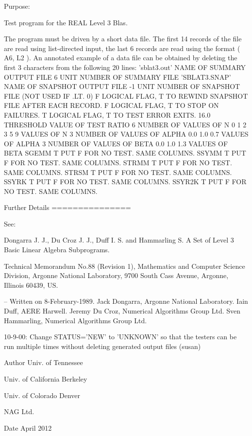 \begin{DoxyParagraph}{Purpose\+: }
\begin{DoxyVerb} Test program for the REAL             Level 3 Blas.

 The program must be driven by a short data file. The first 14 records
 of the file are read using list-directed input, the last 6 records
 are read using the format ( A6, L2 ). An annotated example of a data
 file can be obtained by deleting the first 3 characters from the
 following 20 lines:
 'sblat3.out'      NAME OF SUMMARY OUTPUT FILE
 6                 UNIT NUMBER OF SUMMARY FILE
 'SBLAT3.SNAP'     NAME OF SNAPSHOT OUTPUT FILE
 -1                UNIT NUMBER OF SNAPSHOT FILE (NOT USED IF .LT. 0)
 F        LOGICAL FLAG, T TO REWIND SNAPSHOT FILE AFTER EACH RECORD.
 F        LOGICAL FLAG, T TO STOP ON FAILURES.
 T        LOGICAL FLAG, T TO TEST ERROR EXITS.
 16.0     THRESHOLD VALUE OF TEST RATIO
 6                 NUMBER OF VALUES OF N
 0 1 2 3 5 9       VALUES OF N
 3                 NUMBER OF VALUES OF ALPHA
 0.0 1.0 0.7       VALUES OF ALPHA
 3                 NUMBER OF VALUES OF BETA
 0.0 1.0 1.3       VALUES OF BETA
 SGEMM  T PUT F FOR NO TEST. SAME COLUMNS.
 SSYMM  T PUT F FOR NO TEST. SAME COLUMNS.
 STRMM  T PUT F FOR NO TEST. SAME COLUMNS.
 STRSM  T PUT F FOR NO TEST. SAME COLUMNS.
 SSYRK  T PUT F FOR NO TEST. SAME COLUMNS.
 SSYR2K T PUT F FOR NO TEST. SAME COLUMNS.

 Further Details
 ===============

 See:

    Dongarra J. J., Du Croz J. J., Duff I. S. and Hammarling S.
    A Set of Level 3 Basic Linear Algebra Subprograms.

    Technical Memorandum No.88 (Revision 1), Mathematics and
    Computer Science Division, Argonne National Laboratory, 9700
    South Cass Avenue, Argonne, Illinois 60439, US.

 -- Written on 8-February-1989.
    Jack Dongarra, Argonne National Laboratory.
    Iain Duff, AERE Harwell.
    Jeremy Du Croz, Numerical Algorithms Group Ltd.
    Sven Hammarling, Numerical Algorithms Group Ltd.

    10-9-00:  Change STATUS='NEW' to 'UNKNOWN' so that the testers
              can be run multiple times without deleting generated
              output files (susan)\end{DoxyVerb}
 
\end{DoxyParagraph}
\begin{DoxyAuthor}{Author}
Univ. of Tennessee 

Univ. of California Berkeley 

Univ. of Colorado Denver 

N\+A\+G Ltd. 
\end{DoxyAuthor}
\begin{DoxyDate}{Date}
April 2012 
\end{DoxyDate}
